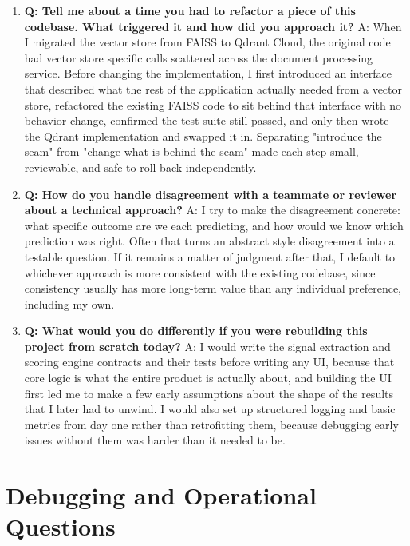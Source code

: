 \documentclass[11pt,a4paper]{report}
\begin{document}
\begin{enumerate}[leftmargin=*]
\item \textbf{Q: Tell me about a time you had to refactor a piece of this codebase. What triggered it and how did you approach it?}
A: When I migrated the vector store from FAISS to Qdrant Cloud, the original code had vector store specific calls scattered across the document processing service. Before changing the implementation, I first introduced an interface that described what the rest of the application actually needed from a vector store, refactored the existing FAISS code to sit behind that interface with no behavior change, confirmed the test suite still passed, and only then wrote the Qdrant implementation and swapped it in. Separating "introduce the seam" from "change what is behind the seam" made each step small, reviewable, and safe to roll back independently.

\item \textbf{Q: How do you handle disagreement with a teammate or reviewer about a technical approach?}
A: I try to make the disagreement concrete: what specific outcome are we each predicting, and how would we know which prediction was right. Often that turns an abstract style disagreement into a testable question. If it remains a matter of judgment after that, I default to whichever approach is more consistent with the existing codebase, since consistency usually has more long-term value than any individual preference, including my own.

\item \textbf{Q: What would you do differently if you were rebuilding this project from scratch today?}
A: I would write the signal extraction and scoring engine contracts and their tests before writing any UI, because that core logic is what the entire product is actually about, and building the UI first led me to make a few early assumptions about the shape of the results that I later had to unwind. I would also set up structured logging and basic metrics from day one rather than retrofitting them, because debugging early issues without them was harder than it needed to be.
\end{enumerate}

\section{Debugging and Operational Questions}
\end{document}
